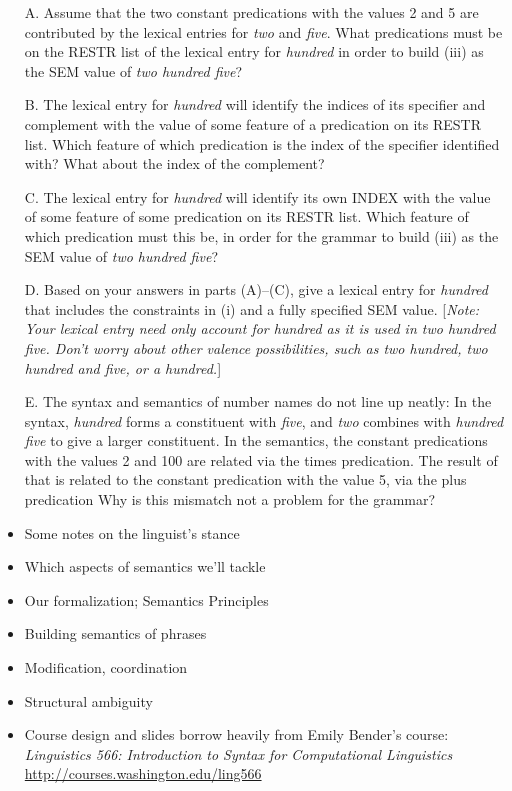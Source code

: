 \documentclass[a4paper,landscape,headrule,footrule]{foils}
\begin{document}
\begin{itemize} 

\item[A.] Assume that the two constant 
predications
with the values 2 and
5 are contributed by the lexical entries for {\it two} and {\it five}.
What predications must be on the RESTR list of the lexical entry for
{\it hundred} in order to build (iii) as the SEM value of {\it two
hundred five}?
\item[B.] The lexical entry for {\it hundred} will identify the
indices of its specifier and complement with the value of some feature
of a predication on its RESTR list.  Which feature of which predication
is the index of the specifier identified with?  What about the index
of the complement?
\item[C.] The lexical entry for {\it hundred} will identify its
own INDEX with the value of some feature of some predication on
its RESTR list.  Which feature of which predication must this
be, in order for the grammar 
to build (iii) as the SEM value of {\it two hundred five}?

\newpage

\item[D.] Based on your answers in parts (A)--(C), 
give a lexical entry for {\it hundred} that includes
the constraints in (i) and a fully specified SEM value.  
[{\sl Note: Your lexical entry need only account for {\it hundred}
as it is used in {\it two hundred five}. Don't worry about other
valence possibilities, such as 
{\it two hundred}, {\it two hundred and five}, or {\it a hundred}.}]
\item[E.] The syntax and semantics of number names do
not line up neatly: In the syntax, {\it hundred} forms a constituent
with {\it five}, and {\it two} combines with {\it hundred five} to
give a larger constituent.  In the semantics, the constant
predications
with the values 2 and 100 are related via the times 
predication.
The result of that is related to the constant 
predication
with the value
5, via the plus 
predication
Why is this mismatch not a problem for the grammar?
\end{itemize}




\begin{itemize}
\item Some notes on the linguist's stance
\item Which aspects of semantics we’ll tackle
\item Our formalization; Semantics Principles
\item Building semantics of phrases
\item Modification, coordination
\item Structural ambiguity
\end{itemize}


\begin{itemize}
\item Course design and slides borrow heavily from Emily Bender's course:
\textit{Linguistics 566: Introduction to Syntax for Computational Linguistics}
\\ \url{http://courses.washington.edu/ling566}
\end{itemize}

%
\end{document}
